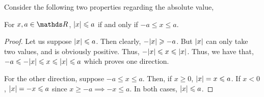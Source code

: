 Consider the following two properties regarding the absolute value,

\begin{plaintheo}
    For \(x, a \in \RR\), \(\abs{x} \leqslant a\) if and only if \( -a \le x \le a\).
\end{plaintheo}

\begin{proof}
    Let us suppose \(\abs{x} \leqslant a\). Then clearly, \(-\abs{x} \geqslant -a\). But 
    \(\abs{x}\) can only take two values, and is obviously positive. Thus, \(-\abs{x} \leqslant 
    x \leqslant \abs{x}\). Thus, we have that, \(-a \leqslant -\abs{x} \leqslant x \leqslant \abs{x} \leqslant a\) which 
    proves one direction.
    
    For the other direction, suppose \(-a \le x \le a\). Then, if \(x \ge 0\), 
    \(\abs{x} = x \leqslant a\). If \(x < 0\), \(\abs{x} = -x \leqslant a\) since \(x \ge -a \implies -x \le a\).
    In both cases, \(\abs{x} \leqslant a\). 
\end{proof}